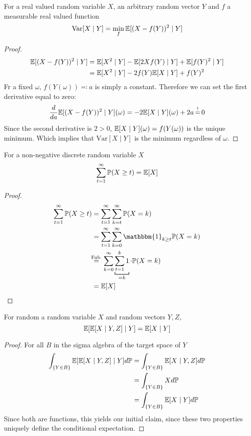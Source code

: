 \begin{lemma}\label{appx4} For a real valued random variable \(X\), an arbitrary random vector \(Y\) and \(f\) a measurable real valued function 
    \[
        \textnormal{Var}[X\mid Y]=\min_{f} \mathbb{E}[ (X-f(Y))^2\mid Y]
    \]
\end{lemma}
\begin{proof}
    \begin{align*}
        \mathbb{E}[(X-f(Y))^2\mid Y] &= \mathbb{E}[X^2\mid Y] - \mathbb{E}[2Xf(Y)\mid Y] + \mathbb{E}[f(Y)^2\mid Y]\\
        &=\mathbb{E}[X^2\mid Y] - 2f(Y)\mathbb{E}[X\mid Y] + f(Y)^2
    \end{align*}  
    Fr a fixed \(\omega\), \(f(Y(\omega))\eqqcolon a\) is simply a constant. Therefore we can set the first derivative equal to zero:
    \begin{align*}
        \frac{d}{da} \E[(X-f(Y))^2\mid Y](\omega)= -2\E[X\mid Y](\omega) +2a \xeq{!} 0
    \end{align*}
    Since the second derivative is \(2>0\), \(\mathbb{E}[X\mid Y](\omega) = f(Y(\omega))\) is the unique minimum. Which implies that \(\text{Var}[X\mid Y]\) is the minimum regardless of \(\omega\).
\end{proof}
\begin{lemma}\label{appx1:summing over probabilities}
    For a non-negative discrete random variable \(X\)
    \[
        \sum_{t=1}^\infty \mathbb{P}(X\ge t)=\mathbb{E}[X]
    \]
\end{lemma}
\begin{proof}
    \begin{align*}
        \sum_{t=1}^\infty \Pr(X\ge t)
        &=\sum_{t=1}^\infty \sum_{k=t}^\infty \Pr(X=k)\\
        &=\sum_{t=1}^\infty \sum_{k=0}^\infty \mathbbm{1}_{k\ge t} \Pr(X=k)\\
        &\lxeq{\text{Fub.}}\sum_{k=0}^\infty \underbracket[0.7pt]{\sum_{t=1}^k 1}_{=k} \cdot \Pr(X=k)\\
        &=\E[X]\qedhere
    \end{align*}
\end{proof}
\begin{lemma}\label{appx1:repeated conditional expectation}
    For random a random variable \(X\) and random vectors \(Y,Z\),
    \[
        \mathbb{E}[ \mathbb{E}[X\mid Y,Z]\mid Y] = \mathbb{E}[X\mid Y]
    \]
\end{lemma}
\begin{proof} For all \(B\) in the sigma algebra of the target space of \(Y\)
    \begin{align*}
        \int_{\{Y\in B\}} \mathbb{E}[\mathbb{E}[X\mid Y,Z]\mid Y ] d\mathbb{P} 
        &= \int_{\{Y\in B\}} \mathbb{E}[X\mid Y,Z]d\mathbb{P}\\
        &=\int_{\{Y\in B\}} X d\mathbb{P}\\
        &=\int_{\{Y\in B\}} \mathbb{E}[X\mid Y] d\mathbb{P}
    \end{align*}
    Since both are functions, this yields our initial claim, since these two properties uniquely define the conditional expectation. 
\end{proof}

